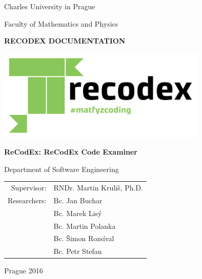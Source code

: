 \pagestyle{empty}
\hypersetup{pageanchor=false}
\begin{center}

\large

Charles University in Prague

\medskip

Faculty of Mathematics and Physics

\vfill

{\bf\Large RECODEX DOCUMENTATION}

\vfill

\centerline{\mbox{\includegraphics[width=100mm]{../logo/logo_recodex.png}}}

\vfill
\vspace{5mm}


\vspace{15mm}

{\LARGE\bfseries ReCodEx: ReCodEx Code Examiner}

\vfill

Department of Software Engineering

\vfill

\begin{tabular}{rl}

Supervisor: & RNDr. Martin Kruliš, Ph.D. \\
\noalign{\vspace{2mm}}
Researchers: & Bc. Jan Buchar \\
			 & Bc. Marek Lisý \\
			 & Bc. Martin Polanka \\
			 & Bc. Šimon Rozsíval \\
			 & Bc. Petr Stefan \\
\end{tabular}

\vfill

Prague 2016

\end{center}

\newpage

\openright
\pagestyle{plain}
\setcounter{page}{1}
